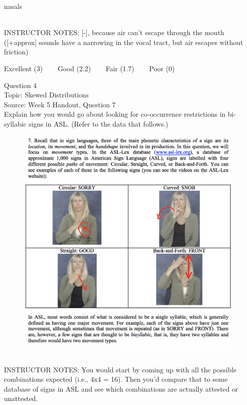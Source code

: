 \documentclass[12pt]{article}
\begin{document}
nasals


~\\
INSTRUCTOR NOTES: [-], because air can't escape through the mouth ([+approx] sounds have a narrowing in the vocal tract, but air escapes without friction)


\vfill
Excellent (3) ~~~ Good (2.2) ~~~ Fair (1.7) ~~~ Poor (0)
\newpage

{\large Question 4}\\

Topic: Skewed Distributions\\
Source: Week 5 Handout, Question 7\\

Explain how you would go about looking for co-occurrence restrictions in bi-syllabic signs in ASL. (Refer to the data that follows.)\\

\begin{figure}[H]
\includegraphics{../images/ASL_movement.png}
\end{figure}

~\\
INSTRUCTOR NOTES: You would start by coming up with all the possible combinations expected (i.e., 4x4 = 16). Then you'd compare that to some database of signs in ASL and see which combinations are actually attested or unattested.
\end{document}
